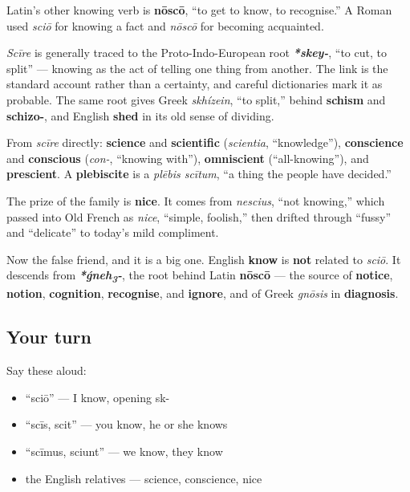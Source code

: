 Latin's other knowing verb is \textbf{nōscō}, \textquotedblleft{}to get to know, to recognise.\textquotedblright{} A Roman used \emph{sciō} for knowing a fact and \emph{nōscō} for becoming acquainted.

\begin{cousinweb}
\emph{Scīre} is generally traced to the Proto-Indo-European root \emph{\textbf{*skey-}}, \textquotedblleft{}to cut, to split\textquotedblright{} — knowing as the act of telling one thing from another. The link is the standard account rather than a certainty, and careful dictionaries mark it as probable. The same root gives Greek \emph{skhízein}, \textquotedblleft{}to split,\textquotedblright{} behind \textbf{schism} and \textbf{schizo-}, and English \textbf{shed} in its old sense of dividing.

From \emph{scīre} directly: \textbf{science} and \textbf{scientific} (\emph{scientia}, \textquotedblleft{}knowledge\textquotedblright{}), \textbf{conscience} and \textbf{conscious} (\emph{con-}, \textquotedblleft{}knowing with\textquotedblright{}), \textbf{omniscient} (\textquotedblleft{}all-knowing\textquotedblright{}), and \textbf{prescient}. A \textbf{plebiscite} is a \emph{plēbis scītum}, \textquotedblleft{}a thing the people have decided.\textquotedblright{}

The prize of the family is \textbf{nice}. It comes from \emph{nescius}, \textquotedblleft{}not knowing,\textquotedblright{} which passed into Old French as \emph{nice}, \textquotedblleft{}simple, foolish,\textquotedblright{} then drifted through \textquotedblleft{}fussy\textquotedblright{} and \textquotedblleft{}delicate\textquotedblright{} to today's mild compliment.

Now the false friend, and it is a big one. English \textbf{know} is \textbf{not} related to \emph{sciō}. It descends from \emph{\textbf{*ǵneh\textsubscript{3}-}}, the root behind Latin \textbf{nōscō} — the source of \textbf{notice}, \textbf{notion}, \textbf{cognition}, \textbf{recognise}, and \textbf{ignore}, and of Greek \emph{gnōsis} in \textbf{diagnosis}.
\end{cousinweb}

\subsection*{Your turn}
Say these aloud:

\begin{itemize}
\raggedright
  \item \textquotedblleft{}sciō\textquotedblright{} — I know, opening sk-
  \item \textquotedblleft{}scīs, scit\textquotedblright{} — you know, he or she knows
  \item \textquotedblleft{}scīmus, sciunt\textquotedblright{} — we know, they know
  \item the English relatives — science, conscience, nice
\end{itemize}

